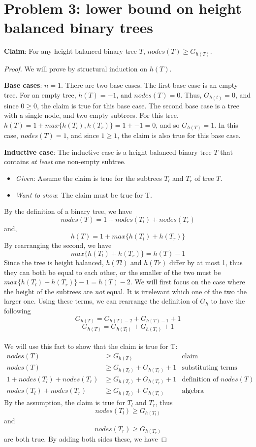 \documentclass[titlepage]{article}
\begin{document}
\section{Problem 3: lower bound on height balanced binary trees}

\textbf{Claim}: For any height balanced binary tree $T$, $nodes(T) \geq G_{h(T)}$.

\begin{proof}
We will prove by structural induction on $h(T)$.

\textbf{Base cases}: $n=1$.  There are two base cases. The first base case is an empty tree. For an empty tree, $h(T) = -1$, and $nodes(T)=0$. Thus, $G_{h(t)}=0$, and since $0\geq0$, the claim is true for this base case. The second base case is a tree with a single node, and two empty subtrees. For this tree, $h(T) = 1 + max\{h(T_l), h(T_r)\} = 1 + -1 = 0$, and so $G_{h(T)} = 1$. In this case, $nodes(T)=1$, and since $1\geq1$, the claim is also true for this base case.


\textbf{Inductive case}: The inductive case is a height balanced binary tree $T$ that contains \textit{at least} one non-empty subtree.
\begin{itemize}
\item \emph{Given}: Assume the claim is true for the subtrees $T_l$ and $T_r$ of tree $T$.
\item \emph{Want to show}: The claim must be true for T.
\end{itemize}
By the definition of a binary tree, we have
$$nodes(T) = 1 + nodes(T_l) + nodes(T_r)$$
and,
$$h(T) = 1 + max\{h(T_l) + h(T_r)\}$$
By rearranging the second, we have
$$max\{h(T_l) + h(T_r)\} = h(T) - 1$$
Since the tree is height balanced, $h(Tl)$ and $h(Tr)$ differ by at most 1, thus they can both be equal to each other, or the smaller of the two must be $max\{h(T_l) + h(T_r)\} -1 = h(T) - 2$. We will first focus on the case where the height of the subtrees are \textit{not} equal. It is irrelevant which one of the two the larger one. Using these terms, we can rearrange the definition of $G_h$ to have the following
$$G_{h(T)}= G_{h(T)-2} + G_{h(T)-1} + 1$$
$$G_{h(T)}= G_{h(T_l)} + G_{h(T_r)} + 1$$\\

We will use this fact to show that the claim is true for T:
\begin{align*}
nodes(T) &\geq G_{h(T)} & \text{claim} \\
nodes(T) &\geq G_{h(T_l)} + G_{h(T_r)} + 1 & \text{substituting terms} \\
1 + nodes(T_l) + nodes(T_r) &\geq G_{h(T_l)} + G_{h(T_r)} + 1 & \text{definition of $nodes(T)$}\\
nodes(T_l) + nodes(T_r) &\geq G_{h(T_l)} + G_{h(T_r)}& \text{algebra}
\end{align*}
By the assumption, the claim is true for $T_l$ and $T_r$, thus
$$nodes(T_l) \geq G_{h(T_l)}$$
and
$$nodes(T_r) \geq G_{h(T_r)}$$
are both true. By adding both sides these, we have
\end{proof}
\end{document}
